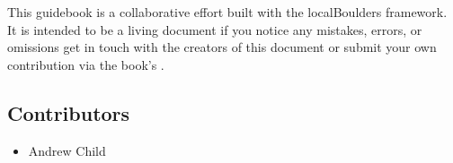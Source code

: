 \begin{multicols*}{2}
This guidebook is a collaborative effort built with the localBoulders framework. It is intended to be a living document if you notice any mistakes, errors, or omissions get in touch with the creators of this document or submit your own contribution via the book's .
\subsection*{Contributors}
\begin{itemize}
\item Andrew Child
\end{itemize}
\end{multicols*}
\clearpage